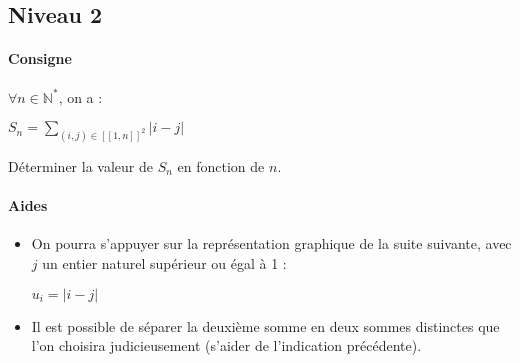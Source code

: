 \documentclass[a4paper]{report}
\newcounter{exnumber}
\begin{document}
			\subsection{Niveau 2}
				\begin{tcolorbox}[colback=white,colframe=black,title=Exercice n°\arabic{exnumber} - Somme et valeur absolue]
					\paragraph{Consigne}
						$\forall n \in \mathbb{N^*}$, on a :\\
							\begin{center}
								$S_n = \sum_{(i,j) \in [\![1,n]\!]^2}|i-j|$
							\end{center}
							Déterminer la valeur de $S_n$ en fonction de $n$.
						
					\tcblower
					
					\paragraph{Aides}
						\begin{itemize}
							\item On pourra s'appuyer sur la représentation graphique de la suite suivante, avec $j$ un entier naturel supérieur ou égal à 1 :
								\begin{center}
									$u_i = |i-j|$
								\end{center}
							\item Il est possible de séparer la deuxième somme en deux sommes distinctes que l'on choisira judicieusement (s'aider de l'indication précédente).
						\end{itemize}
				\end{tcolorbox}
				\addtocounter{exnumber}{1}
				
\end{document}
